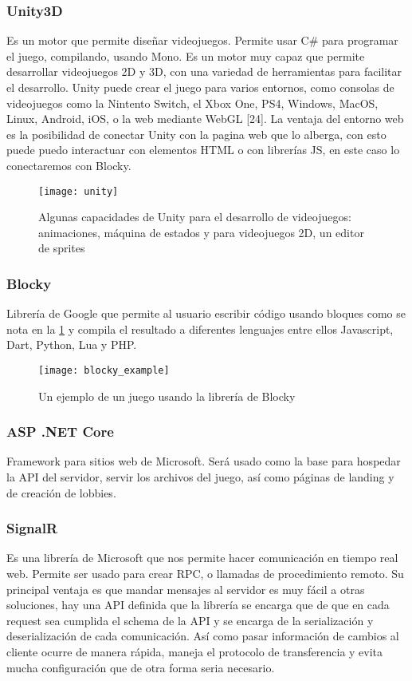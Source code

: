 \subsubsection{Unity3D}
Es un motor que permite diseñar videojuegos. Permite usar C# para programar el juego, compilando, usando Mono. \cite{unity2019} Es un motor muy capaz que permite desarrollar videojuegos 2D y 3D, con una variedad de herramientas para facilitar el desarrollo.
Unity puede crear el juego para varios entornos, como consolas de videojuegos como la Nintento Switch, el Xbox One, PS4, Windows, MacOS, Linux, Android, iOS, o la web mediante WebGL [24]. La ventaja del entorno web es la posibilidad de conectar Unity con la pagina web que lo alberga, con esto puede puedo interactuar con elementos HTML o con librerías JS, en este caso lo conectaremos con Blocky.
\begin{figure}
    \caption{Algunas capacidades de Unity para el desarrollo de videojuegos: animaciones, máquina de estados y para videojuegos 2D, un editor de sprites}
    \centering
    \texttt{[image: unity]}
\end{figure}

\subsubsection{Blocky}
Librería de Google que permite al usuario escribir código usando bloques como se nota en la \ref{fig:blocky_example} y compila el resultado a diferentes lenguajes entre ellos Javascript, Dart, Python, Lua y PHP.

\begin{figure}
    \caption{Un ejemplo de un juego usando la librería de Blocky}
    \centering
    \texttt{[image: blocky\_example]}
    \label{fig:blocky_example}
\end{figure}

\subsubsection{ASP .NET Core}
Framework para sitios web de Microsoft. Será usado como la base para hospedar la API del servidor, servir los archivos del juego, así como páginas de landing y de creación de lobbies.

\subsubsection{SignalR}
Es una librería de Microsoft que nos permite hacer comunicación en tiempo real web. Permite ser usado para crear RPC, o llamadas de procedimiento remoto. Su principal ventaja es que mandar mensajes al servidor es muy fácil a otras soluciones, hay una API definida que la librería se encarga que de que en cada request sea cumplida el schema de la API y se encarga de la serialización y deserialización de cada comunicación. Así como pasar información de cambios al cliente ocurre de manera rápida, maneja el protocolo de transferencia y evita mucha configuración que de otra forma seria necesario.

